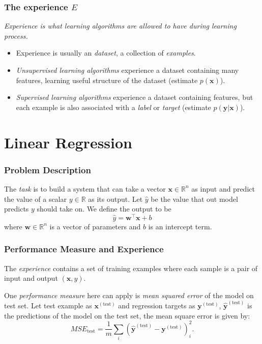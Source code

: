 \documentclass{beamer}
\begin{document}
\begin{frame}
  \frametitle{The experience $E$}

  \emph{Experience is what learning algorithms are allowed to have during learning process.}

  \begin{itemize}
    \item[\ding{229}] Experience is usually an \emph{dataset}, a collection of \emph{examples}.
    \item[\ding{229}] \emph{Unsupervised learning algorithms} experience a dataset containing many features, learning useful structure of the dataset (estimate $p(\mathbf{x})$).
    \item[\ding{229}] \emph{Supervised learning algorithms} experience a dataset containing features, but each example is also associated with a \emph{label} or \emph{target} (estimate $p(\mathbf{y}|\mathbf{x})$).
  \end{itemize}
  
\end{frame}

\section{Linear Regression}

\begin{frame}
  \frametitle{Problem Description}

  The \emph{task} is to build a system that can take a vector $\mathbf{x}\in\mathbb{R}^{n}$ as input and predict the value of a scalar $y\in\mathbb{R}$ as its output. Let $\hat{y}$ be the value that out model predicts $y$ should take on. We define the output to be
  \begin{equation*}
    \hat{y}=\mathbf{w}^{\top}\mathbf{x}+b
  \end{equation*}
  where $\mathbf{w}\in\mathbb{R}^{n}$ is a vector of parameters and $b$ is an intercept term.
\end{frame}

\begin{frame}
  \frametitle{Performance Measure and Experience}

  The \emph{experience} contains a set of training examples where each sample is a pair of input and output $(\mathbf{x}, y)$.

  One \emph{performance measure} here can apply is \emph{mean squared error} of the model on test set. Let test example as $\mathbf{x}^{(\text{test})}$ and regression targets as $\mathbf{y}^{(\text{test})}$, $\hat{\mathbf{y}}^{(\text{test})}$ is the predictions of the model on the test set, the mean square error is given by:
  \begin{equation*}
    MSE_{\text{test}}=\frac{1}{m}\sum_{i}(\hat{\mathbf{y}}^{(\text{test})}-\mathbf{y}^{(\text{test})})_{i}^{2}.
  \end{equation*}
\end{frame}
\end{document}
